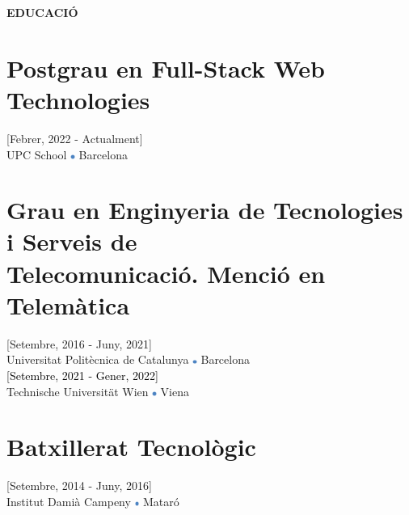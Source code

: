 \documentclass[../main.tex]{subfiles}
\begin{document}
    \vspace*{-0.4cm}
    \textbf{\textcolor{myCV2}{EDUCACIÓ\underline{\hspace{7.95cm}}}}
        \vspace*{-0.3cm}
        
        \section*{Postgrau en Full-Stack Web Technologies}
        \vspace*{-0.4cm}
        [Febrer, 2022 - Actualment] \\
        UPC School
        \includegraphics[width=0.15cm]{assets/full.png} 
        Barcelona
        
        \vspace*{-0.25cm}
        \section*{Grau en Enginyeria de Tecnologies i Serveis de \\Telecomunicació. Menció en Telemàtica}
        \vspace*{-0.4cm}
        [Setembre, 2016 - Juny, 2021] \\
        Universitat Politècnica de Catalunya 
        \includegraphics[width=0.15cm]{assets/full.png} 
        Barcelona \\
        \textcolor{black}{[Setembre, 2021 - Gener, 2022]}\\
        Technische Universität Wien
        \includegraphics[width=0.15cm]{assets/full.png} 
        Viena
        
        \vspace*{-0.25cm}
        \section*{Batxillerat Tecnològic}
        \vspace*{-0.4cm}
        [Setembre, 2014 - Juny, 2016] \\
        Institut Damià Campeny
        \includegraphics[width=0.15cm]{assets/full.png} 
        Mataró

\end{document}

